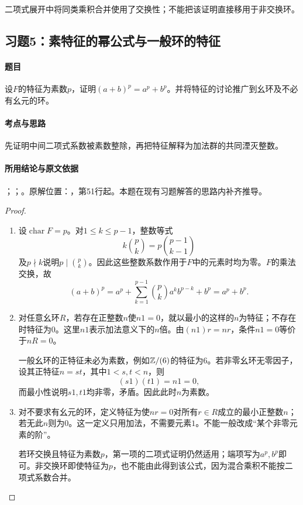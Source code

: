 二项式展开中将同类乘积合并使用了交换性；不能把该证明直接移用于非交换环。



\subsection{习题5：素特征的幂公式与一般环的特征}

\label{ex:3:5}

\paragraph{题目}

设$F$的特征为素数$p$，证明$(a+b)^p=a^p+b^p$。并将特征的讨论推广到幺环及不必有幺元的环。

\paragraph{考点与思路}

先证明中间二项式系数被素数整除，再把特征解释为加法群的共同湮灭整数。

\paragraph{所用结论与原文依据}

；；。原解位置：，第51行起。本题在现有习题解答的思路内补齐推导。


\begin{proof}

\begin{enumerate}
\item 设$\operatorname{char}F=p$。对$1\le k\le p-1$，整数等式
\[
k\binom pk=p\binom{p-1}{k-1}
\]
及$p\nmid k$说明$p\mid\binom pk$。因此这些整数系数作用于$F$中的元素时均为零。$F$的乘法交换，故
\[
(a+b)^p=a^p+\sum_{k=1}^{p-1}\binom pk a^kb^{p-k}+b^p=a^p+b^p.
\]
\item 对任意幺环$R$，若存在正整数$n$使$n1=0$，就以最小的这样的$n$为特征；不存在时特征为$0$。这里$n1$表示加法意义下的$n$倍。由$(n1)r=nr$，条件$n1=0$等价于$nR=0$。

一般幺环的正特征未必为素数，例如$\mathbb Z/(6)$的特征为$6$。若非零幺环无零因子，设其正特征$n=st$，其中$1<s,t<n$，则
\[
(s1)(t1)=n1=0,
\]
而最小性说明$s1,t1$均非零，矛盾。因此此时$n$为素数。
\item 对不要求有幺元的环，定义特征为使$nr=0$对所有$r\in R$成立的最小正整数$n$；若无此$n$则为$0$。这一定义只用加法，不需要元素$1$。不能一般改成“某个非零元素的阶”。

若环交换且特征为素数$p$，第一项的二项式证明仍然适用；端项写为$a^p,b^p$即可。非交换环即使特征为$p$，也不能由此得到该公式，因为混合乘积不能按二项式系数合并。
\end{enumerate}

\end{proof}

